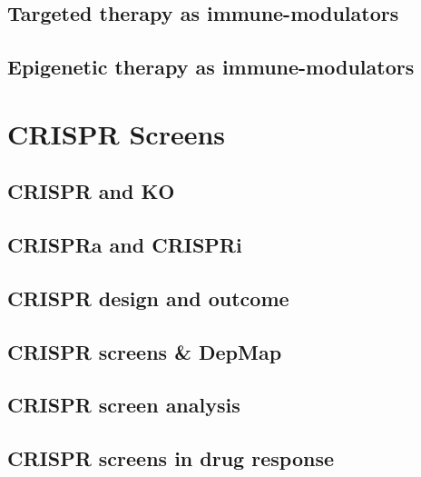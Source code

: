 \documentclass[
]{book}
\begin{document}
\hypertarget{targeted-therapy-as-immune-modulators}{%
\section{Targeted therapy as immune-modulators}\label{targeted-therapy-as-immune-modulators}}

\hypertarget{epigenetic-therapy-as-immune-modulators}{%
\section{Epigenetic therapy as immune-modulators}\label{epigenetic-therapy-as-immune-modulators}}

\hypertarget{crispr}{%
\chapter{CRISPR Screens}\label{crispr}}

\hypertarget{crispr-and-ko}{%
\section{CRISPR and KO}\label{crispr-and-ko}}

\hypertarget{crispra-and-crispri}{%
\section{CRISPRa and CRISPRi}\label{crispra-and-crispri}}

\hypertarget{crispr-design-and-outcome}{%
\section{CRISPR design and outcome}\label{crispr-design-and-outcome}}

\hypertarget{crispr-screens-depmap}{%
\section{CRISPR screens \& DepMap}\label{crispr-screens-depmap}}

\hypertarget{crispr-screen-analysis}{%
\section{CRISPR screen analysis}\label{crispr-screen-analysis}}

\hypertarget{crispr-screens-in-drug-response}{%
\section{CRISPR screens in drug response}\label{crispr-screens-in-drug-response}}
\end{document}
